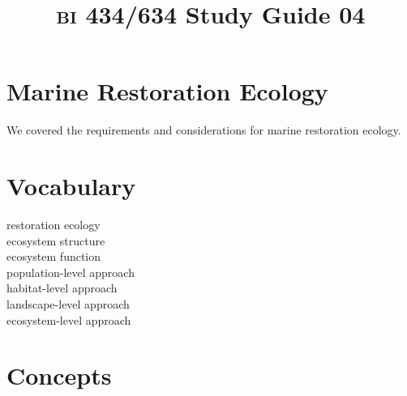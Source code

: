 \documentclass[letterpaper]{tufte-handout}
\title{{\scshape bi} 434/634 Study Guide 04}
\date{} %
\begin{document}
\maketitle	%

\section*{Marine Restoration Ecology}

We covered the requirements and considerations for marine restoration ecology.

\section*{Vocabulary}

\vspace{-1\baselineskip}
\begin{multicols}{2}
restoration ecology \\
ecosystem structure \\
ecosystem function \\
population-level approach \\
habitat-level approach \\
landscape-level approach \\
ecosystem-level approach \\
\end{multicols}

\section*{Concepts}
\end{document}
